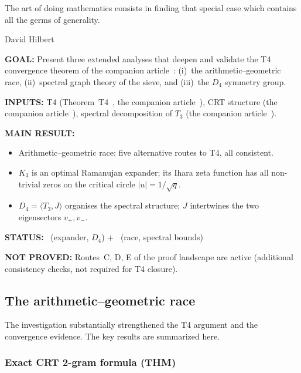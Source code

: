 \documentclass[12pt,a4paper]{article}
\begin{document}
\epigraph{The art of doing mathematics consists in finding that special
case which contains all the germs of generality.}{David Hilbert}

\begin{statusbox}
\textbf{GOAL:}
  Present three extended analyses that deepen and validate the T4
  convergence theorem of the companion article~\cite{companion_M3}: (i)~the
  arithmetic--geometric race, (ii)~spectral graph theory of the
  sieve, and (iii)~the $D_4$ symmetry group.

\textbf{INPUTS:}
  T4 (Theorem~T4~\cite{companion_M3}, the companion article~\cite{companion_M3}), CRT structure
  (the companion article~\cite{companion_M1}), spectral decomposition of $T_3$ (the companion article~\cite{companion_M3}).

\textbf{MAIN RESULT:}
  \begin{itemize}[nosep]
  \item Arithmetic--geometric race: five alternative routes to T4,
    all consistent.
  \item $K_3$ is an optimal Ramanujan expander; its Ihara zeta function
    has all non-trivial zeros on the critical circle $|u| = 1/\sqrt{q}$.
  \item $D_4 = \langle T_3, J \rangle$ organises the spectral
    structure; $J$ intertwines the two eigensectors $v_+, v_-$.
  \end{itemize}

\textbf{STATUS:}
  \THMTAG~(expander, $D_4$) + \VALTAG~(race, spectral bounds)

\textbf{NOT PROVED:}
  Routes~C, D, E of the proof landscape are active (additional
  consistency checks, not required for T4 closure).
\end{statusbox}

\subsection{The arithmetic--geometric race}
\label{sec:ch7b_race}

The investigation substantially strengthened the T4
argument and the convergence evidence. The key results are summarized here.

\subsubsection{Exact CRT 2-gram formula (THM)}
\end{document}
